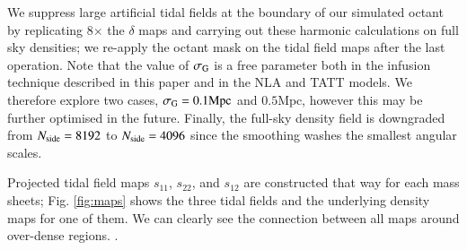 We suppress large artificial tidal fields at the boundary of our simulated octant by replicating 8$\times$ the  $\delta$ maps and carrying out these harmonic calculations  on full sky densities; we re-apply the octant mask on the tidal field maps after the last operation.
Note that the value of $\sigma_{\rm G}$ is a free parameter both in the infusion technique described in this paper and in the NLA and TATT models.
We therefore explore two cases, $\sigma_{\rm G}=0.1\mathrm{Mpc}$ and $0.5\mathrm{Mpc}$, however this may be further optimised in the future.
Finally, the full-sky density field is downgraded from $N_{\rm side}=8192$ to $N_{\rm side}=4096$ since the smoothing washes the smallest angular scales. 



Projected tidal field maps $s_{11}$, $s_{22}$, and $s_{12}$ are constructed that way for each mass sheets; Fig. \ref{fig:maps} shows the  three tidal fields and the underlying density maps for one of them.
We can clearly see the connection between all maps around over-dense regions. . 


